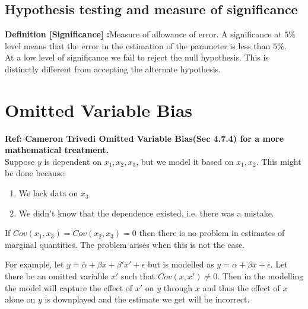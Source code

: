 \documentclass[notoc]{tufte-book}
\begin{document}
\subsection{Hypothesis testing and measure of significance}
\textbf{Definition [Significance] :}Measure of allowance of error. A significance at $5\%$ level means that the error in the estimation of the parameter is less than $5\%$.\\
At a low level of significance we fail to reject the null hypothesis. This is distinctly different from accepting the alternate hypothesis.


\section{Omitted Variable Bias}
\textbf{Ref: Cameron Trivedi Omitted Variable Bias(Sec 4.7.4) for a more mathematical treatment.\cite{Cameron_Trivedi_2005}}\\\noindent
Suppose $y$ is dependent on $x_1,x_2,x_3$, but we model it based on $x_1,x_2$. This might be done because:
\begin{enumerate}
    \item We lack data on $x_3$
    \item We didn't know that the dependence existed, i.e. there was a mistake.
\end{enumerate}
If $Cov(x_1,x_3)=Cov(x_2,x_3)=0$ then there is no problem in estimates of marginal quantities. The problem arises when this is not the case.

For example, let $y=\alpha+\beta x+\beta'x'+\epsilon$ but is modelled as $y=\alpha+\beta x+\epsilon$. Let there be an omitted variable $x'$ such that $Cov(x,x')\ne0$. Then in the modelling the model will capture the effect of $x'$ on $y$ through $x$ and thus the effect of $x$ alone on $y$ is downplayed and the estimate we get will be incorrect.
\end{document}
